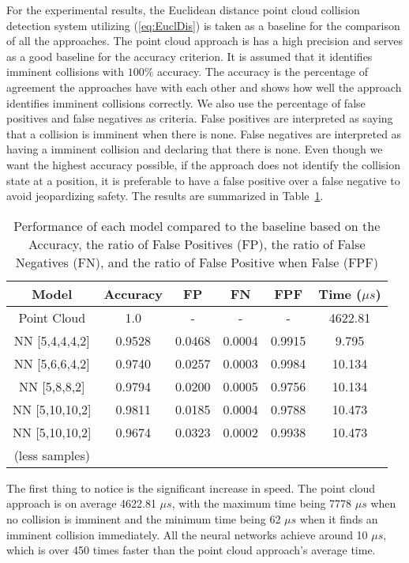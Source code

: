 \documentclass[conference]{IEEEtran}
\begin{document}
For the experimental results, the Euclidean distance point cloud collision detection system utilizing (\ref{eq:EuclDis}) is taken as a baseline for the comparison of all the approaches. The point cloud approach is has a high precision and serves as a good baseline for the accuracy criterion. It is assumed that it identifies imminent collisions with $100\%$ accuracy. The accuracy is the percentage of agreement the approaches have with each other and shows how well the approach identifies imminent collisions correctly. We also use the percentage of false positives and false negatives as criteria. False positives are interpreted as saying that a collision is imminent when there is none. False negatives are interpreted as having a imminent collision and declaring that there is none. Even though we want the highest accuracy possible, if the approach does not identify the collision state at a position, it is preferable to have a false positive over a false negative to avoid jeopardizing safety. The results are summarized in Table~\ref{table:result-comparison}.

\begin{table}[ht]
\centering
\begin{tabular}{|c|c|c|c|c|c|}
\hline
Model	& \!Accuracy\! 	& FP  & FN     & FPF	& \!Time ($\mu s$)\!\\
\hline\hline
Point Cloud         & 1.0 	 & - 	  & - 	& - & 4622.81\\
\hline
NN [5,4,4,4,2]   	& 0.9528 & 0.0468 & 0.0004 & 0.9915 & 9.795 \\
\hline
NN [5,6,6,4,2]   	& 0.9740 & 0.0257 & 0.0003 & 0.9984 & 10.134\\
\hline
NN [5,8,8,2]        & 0.9794 & 0.0200 & 0.0005 & 0.9756 & 10.134\\
\hline
NN [5,10,10,2]      & 0.9811 & 0.0185 & 0.0004 & 0.9788 & 10.473\\
\hline
NN [5,10,10,2] 		& 0.9674 & 0.0323 & 0.0002 & 0.9938 & 10.473\\
(less samples) & & & & &\\
\hline
\end{tabular}
\vspace{1mm}
\caption{Performance of each model compared to the baseline based on the Accuracy, the ratio of False Positives (FP), the ratio of False Negatives (FN), and the ratio of False Positive when False (FPF)}
\label{table:result-comparison}
\end{table}

The first thing to notice is the significant increase in speed. The point cloud approach is on average 4622.81 $\mu s$, with the maximum time being 7778 $\mu s$ when no collision is imminent and the minimum time being 62 $\mu s$ when it finds an imminent collision immediately. All the neural networks achieve around 10 $\mu s$, which is over 450 times faster than the point cloud approach's average time.
\end{document}
